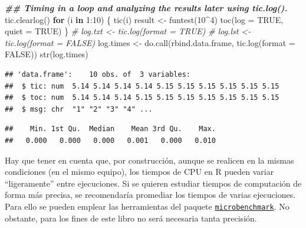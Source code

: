 \documentclass[
]{book}
\newenvironment{Shaded}{\begin{snugshade}}{\end{snugshade}}
\newcommand{\AttributeTok}[1]{\textcolor[rgb]{0.77,0.63,0.00}{#1}}
\newcommand{\CommentTok}[1]{\textcolor[rgb]{0.56,0.35,0.01}{\textit{#1}}}
\newcommand{\ConstantTok}[1]{\textcolor[rgb]{0.00,0.00,0.00}{#1}}
\newcommand{\ControlFlowTok}[1]{\textcolor[rgb]{0.13,0.29,0.53}{\textbf{#1}}}
\newcommand{\DecValTok}[1]{\textcolor[rgb]{0.00,0.00,0.81}{#1}}
\newcommand{\DocumentationTok}[1]{\textcolor[rgb]{0.56,0.35,0.01}{\textbf{\textit{#1}}}}
\newcommand{\FunctionTok}[1]{\textcolor[rgb]{0.00,0.00,0.00}{#1}}
\newcommand{\NormalTok}[1]{#1}
\newcommand{\OtherTok}[1]{\textcolor[rgb]{0.56,0.35,0.01}{#1}}
\newcommand{\SpecialCharTok}[1]{\textcolor[rgb]{0.00,0.00,0.00}{#1}}
\theoremstyle{break}
\theoremstyle{definition}
\theoremstyle{definition}
\theoremstyle{definition}
\theoremstyle{definition}
\theoremstyle{remark}
\begin{document}
\begin{Shaded}
\begin{Highlighting}[]
\DocumentationTok{\#\# Timing in a loop and analyzing the results later using tic.log().}
\FunctionTok{tic.clearlog}\NormalTok{()}
\ControlFlowTok{for}\NormalTok{ (i }\ControlFlowTok{in} \DecValTok{1}\SpecialCharTok{:}\DecValTok{10}\NormalTok{)}
\NormalTok{\{}
   \FunctionTok{tic}\NormalTok{(i)}
\NormalTok{   result }\OtherTok{\textless{}{-}} \FunctionTok{funtest}\NormalTok{(}\DecValTok{10}\SpecialCharTok{\^{}}\DecValTok{4}\NormalTok{)}
   \FunctionTok{toc}\NormalTok{(}\AttributeTok{log =} \ConstantTok{TRUE}\NormalTok{, }\AttributeTok{quiet =} \ConstantTok{TRUE}\NormalTok{)}
\NormalTok{\}}
\CommentTok{\# log.txt \textless{}{-} tic.log(format = TRUE)}
\CommentTok{\# log.lst \textless{}{-} tic.log(format = FALSE)}
\NormalTok{log.times }\OtherTok{\textless{}{-}} \FunctionTok{do.call}\NormalTok{(rbind.data.frame, }\FunctionTok{tic.log}\NormalTok{(}\AttributeTok{format =} \ConstantTok{FALSE}\NormalTok{))}
\FunctionTok{str}\NormalTok{(log.times)}
\end{Highlighting}
\end{Shaded}

\begin{verbatim}
## 'data.frame':    10 obs. of  3 variables:
##  $ tic: num  5.14 5.14 5.14 5.14 5.15 5.15 5.15 5.15 5.15 5.15
##  $ toc: num  5.14 5.14 5.14 5.15 5.15 5.15 5.15 5.15 5.15 5.15
##  $ msg: chr  "1" "2" "3" "4" ...
\end{verbatim}

\begin{Shaded}
\end{Shaded}

\begin{verbatim}
##    Min. 1st Qu.  Median    Mean 3rd Qu.    Max. 
##   0.000   0.000   0.000   0.001   0.000   0.010
\end{verbatim}

Hay que tener en cuenta que, por construcción, aunque se realicen en la mismas condiciones (en el mismo equipo), los tiempos de CPU en R pueden variar ``ligeramente'' entre ejecuciones.
Si se quieren estudiar tiempos de computación de forma más precisa, se recomendaría promediar los tiempos de varias ejecuciones.
Para ello se pueden emplear las herramientas del paquete \href{https://CRAN.R-project.org/package=microbenchmark}{\texttt{microbenchmark}}.
No obstante, para los fines de este libro no será necesaria tanta precisión.
\end{document}
